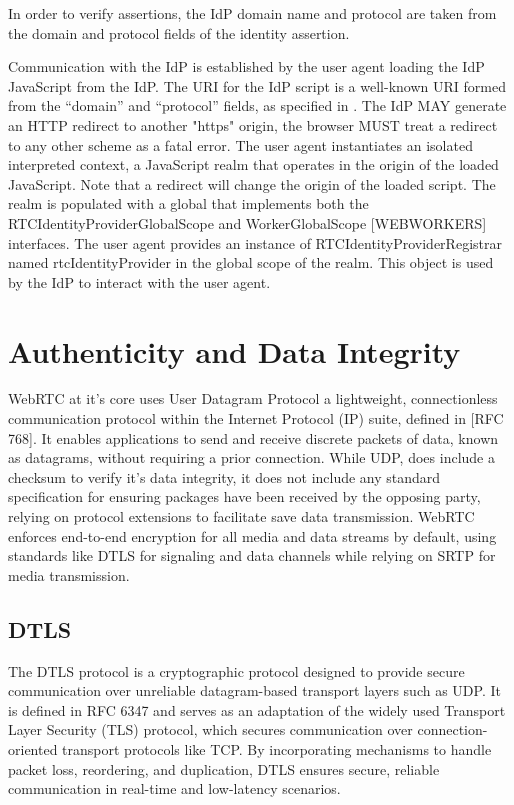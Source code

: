 \documentclass[conference]{IEEEtran}
\begin{document}
In order to verify assertions, the IdP domain name and protocol are taken from the
domain and protocol fields of the identity assertion.

Communication with the IdP is established by the user agent loading the IdP JavaScript from
the IdP. The URI for the IdP script is a well-known URI formed from the “domain”
and “protocol” fields, as specified in \cite{RFC8827}.
The IdP MAY generate an HTTP redirect to another "https" origin, the browser
MUST treat a redirect to any other scheme as a fatal error.
The user agent instantiates an isolated interpreted context, a JavaScript realm that
operates in the origin of the loaded JavaScript. Note that a redirect will change the
origin of the loaded script. The realm is populated with a global that implements both the
RTCIdentityProviderGlobalScope and WorkerGlobalScope [WEBWORKERS] interfaces.
The user agent provides an instance of RTCIdentityProviderRegistrar named
rtcIdentityProvider in the global scope of the realm. This object is used by the IdP to
interact with the user agent.

\section{Authenticity and Data Integrity}
WebRTC at it's core uses User Datagram Protocol a lightweight, connectionless communication protocol 
within the Internet Protocol (IP) suite, defined in [RFC 768]. It enables applications to send and receive 
discrete packets of data, known as datagrams, without requiring a prior connection. While UDP, does
include a checksum to verify it's data integrity, it does not include any standard specification for ensuring
packages have been received by the opposing party, relying on protocol extensions to facilitate save
data transmission. \cite{RFC768}
WebRTC enforces end-to-end encryption for all media and data streams by default, using 
standards like DTLS for signaling and data channels while relying on SRTP for media transmission. \cite{RFC8826}

\subsection{DTLS}
The DTLS protocol is a cryptographic protocol designed to provide secure communication over unreliable datagram-based 
transport layers such as UDP. It is defined in RFC 6347 and serves as an adaptation of the widely used Transport 
Layer Security (TLS) protocol, which secures communication over connection-oriented transport protocols like TCP. 
By incorporating mechanisms to handle packet loss, reordering, and duplication, DTLS ensures secure, reliable 
communication in real-time and low-latency scenarios.\cite{RFC6347}
\end{document}

